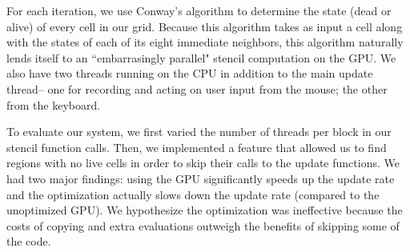 \documentclass[onecolumn,12pt]{IEEEtran}
\begin{document}
For each iteration, we use Conway's algorithm to determine the state (dead or
alive) of every cell in our grid. Because this algorithm takes as input a cell
along with the states of each of its eight immediate neighbors, this algorithm
naturally lends itself to an ``embarrasingly parallel" stencil computation on
the GPU. We also have two threads running on the CPU in addition to the main
update thread-- one for recording and acting on user input from the mouse; the
other from the keyboard. 
	
To evaluate our system, we first varied the number of threads per block in our
stencil function calls. Then, we implemented a feature that allowed us to find
regions with no live cells in order to skip their calls to the update
functions.  We had two major findings: using the GPU significantly speeds up
the update rate and the optimization actually slows down the update rate
(compared to the unoptimized GPU). We hypothesize the optimization was
ineffective because the costs of copying and extra evaluations outweigh the
benefits of skipping some of the code.
\end{document}
